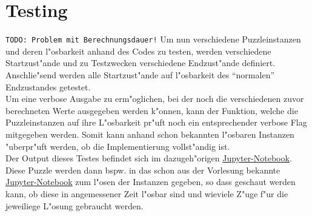 \section{Testing} %
\label{cha:Testing}
\texttt{TODO: Problem mit Berechnungsdauer!}
Um nun verschiedene Puzzleinstanzen und deren l"osbarkeit anhand des Codes zu testen, werden verschiedene Startzust"ande und zu Testzwecken verschiedene Endzust"ande definiert. Anschlie"send werden alle Startzust"ande auf l"osbarkeit des \enquote{normalen} Endzustandes getestet.\\
Um eine verbose Ausgabe zu erm"oglichen, bei der noch die verschiedenen zuvor berechneten Werte ausgegeben werden k"onnen, kann der Funktion, welche die Puzzleinstanzen auf ihre L"osbarkeit pr"uft noch ein entsprechender verbose Flag mitgegeben werden. Somit kann anhand schon bekannten l"osbaren Instanzen "uberpr"uft werden, ob die Implementierung vollst"andig ist.\\
Der Output dieses Testes befindet sich im dazugeh"origen \textcolor{violet}{\href{https://github.com/stubifox/ai-termpaper/blob/main/code/15-solvable-v1.ipynb}{Jupyter-Notebook}}.\\
Diese Puzzle werden dann bspw. in das schon aus der Vorlesung bekannte \textcolor{violet}{\href{https://github.com/karlstroetmann/Artificial-Intelligence/blob/master/Python/1\%20Search/Iterative-Deepening-A-Star-Search.ipynb}{Jupyter-Notebook}} zum l"osen der Instanzen gegeben, so dass geschaut werden kann, ob diese in angemessener Zeit l"osbar sind und wieviele Z"uge f"ur die jeweiliege L"osung gebraucht werden.
